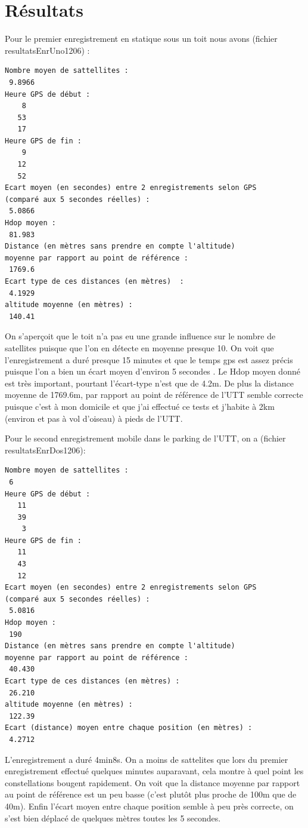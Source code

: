 \documentclass{report}
\begin{document}
\section{Résultats}
Pour le premier enregistrement en statique sous un toit nous avons 
(fichier resultatsEnrUno1206) :

\begin{verbatim}
Nombre moyen de sattellites :
 9.8966
Heure GPS de début :
    8
   53
   17
Heure GPS de fin :
    9
   12
   52
Ecart moyen (en secondes) entre 2 enregistrements selon GPS 
(comparé aux 5 secondes réelles) :
 5.0866
Hdop moyen :
 81.983
Distance (en mètres sans prendre en compte l'altitude)
moyenne par rapport au point de référence :
 1769.6
Ecart type de ces distances (en mètres)  :
 4.1929
altitude moyenne (en mètres) :
 140.41
\end{verbatim}

On s'aperçoit que le toit n'a pas eu une grande influence sur le nombre
de satellites puisque que l'on en détecte en moyenne presque 10. On
voit que l'enregistrement a duré presque 15 minutes et que le temps
gps est assez précis puisque l'on a bien un écart moyen d'environ 
5 secondes . Le Hdop moyen donné est très important, pourtant l'écart-type
n'est que de 4.2m. De plus la distance moyenne de 1769.6m,
par rapport au point de
référence de l'UTT semble correcte puisque c'est à mon domicile et que 
j'ai effectué ce tests et j'habite à 2km (environ et pas à vol d'oiseau) 
à pieds de l'UTT.

Pour le second enregistrement mobile dans le parking de l'UTT, on a 
(fichier resultatsEnrDos1206):

\begin{verbatim}
Nombre moyen de sattellites :
 6
Heure GPS de début :
   11
   39
    3
Heure GPS de fin :
   11
   43
   12
Ecart moyen (en secondes) entre 2 enregistrements selon GPS 
(comparé aux 5 secondes réelles) :
 5.0816
Hdop moyen :
 190
Distance (en mètres sans prendre en compte l'altitude) 
moyenne par rapport au point de référence :
 40.430
Ecart type de ces distances (en mètres) :
 26.210
altitude moyenne (en mètres) :
 122.39
Ecart (distance) moyen entre chaque position (en mètres) :
 4.2712
\end{verbatim}
 
L'enregistrement a duré 4min8s.
On a moins de sattelites que lors du premier enregistrement effectué
quelques minutes auparavant, cela montre à quel point les constellations
bougent rapidement. On voit que la distance moyenne par rapport au 
point de référence est un peu basse (c'est plutôt plus proche de 100m
que de 40m). Enfin l'écart moyen entre chaque position semble à peu
près correcte, on s'est bien déplacé de quelques mètres toutes les
5 secondes.
\end{document}
